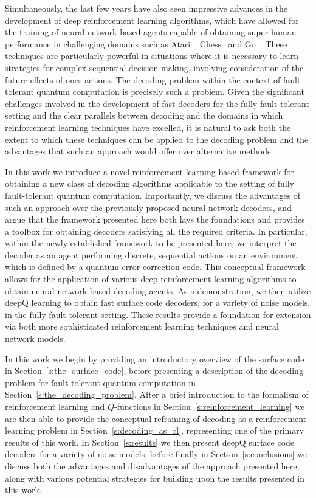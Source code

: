 \documentclass[twocolumn,preprintnumbers,amsmath,amssymb,notitlepage,nofootinbib,longbibliography,superscriptaddress,aps,pra,10pt]{revtex4-1}
\begin{document}
	Simultaneously, the last few years have also seen impressive advances in the development of deep reinforcement learning algorithms, which have allowed for the training of neural network based agents capable of obtaining super-human performance in challenging domains such as Atari~\cite{RLMnih15,RLschaul2015prioritized,RLvan2016deep,RLwang2015dueling}, Chess~\cite{RLsilver2017mastering} and Go~\cite{RLSilver2016,RLSilver17b}.
	These techniques are particularly powerful in situations where it is necessary to learn strategies for complex sequential decision making, involving consideration of the future effects of ones actions.
	The decoding problem within the context of fault-tolerant quantum computation is precisely such a problem.
	Given the significant challenges involved in the development of fast decoders for the fully fault-tolerant setting and the clear parallels between decoding and the domains in which reinforcement learning techniques have excelled, it is natural to ask both the extent to which these techniques can be applied to the decoding problem and the advantages that such an approach would offer over alternative methods.

	In this work we introduce a novel reinforcement learning based framework for obtaining a new class of decoding algorithms applicable to the setting of fully fault-tolerant quantum computation.
	Importantly, we discuss the advantages of such an approach over the previously proposed neural network decoders, and argue that the framework presented here both lays the foundations and provides a toolbox for obtaining decoders satisfying all the required criteria.
	In particular, within the newly established framework to be presented here, we interpret the decoder as an agent performing discrete, sequential actions on an environment which is defined by a quantum error correction code.
	This conceptual framework allows for the application of various deep reinforcement learning algorithms to obtain neural network based decoding agents.
	As a demonstration, we then utilize deepQ learning to obtain fast surface code decoders, for a variety of noise models, in the fully fault-tolerant setting.
	These results provide a foundation for extension via both more sophisticated reinforcement learning techniques and neural network models.

	In this work we begin by providing an introductory overview of the surface code in Section~\ref{s:the_surface_code}, before presenting a description of the decoding problem for fault-tolerant quantum computation in Section~\ref{s:the_decoding_problem}.
	After a brief introduction to the formalism of reinforcement learning and $Q$-functions in Section~\ref{s:reinforcement_learning} we are then able to provide the conceptual reframing of decoding as a reinforcement learning problem in Section~\ref{s:decoding_as_rl}, representing one of the primary results of this work.
	In Section~\ref{s:results} we then present deepQ surface code decoders for a variety of noise models, before finally in Section~\ref{s:conclusions} we discuss both the advantages and disadvantages of the approach presented here, along with various potential strategies for building upon the results presented in this work.
\end{document}
